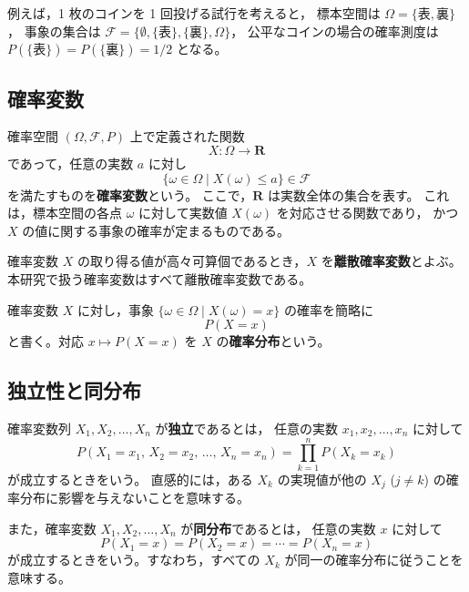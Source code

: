 \documentclass[a4j,dvipdfmx]{jsarticle}
\theoremstyle{plainnote}
\begin{document}
例えば，1 枚のコインを 1 回投げる試行を考えると，
標本空間は $\Omega=\{\text{表},\text{裏}\}$，
事象の集合は $\mathcal{F}=\{\emptyset,\{\text{表}\},\{\text{裏}\},\Omega\}$，
公平なコインの場合の確率測度は $P(\{\text{表}\})=P(\{\text{裏}\})=1/2$ となる。

\subsection{確率変数}

確率空間 $(\Omega,\mathcal{F},P)$ 上で定義された関数
\[
  X:\Omega \longrightarrow \mathbf{R}
\]
であって，任意の実数 $a$ に対し
\[
  \{\omega \in \Omega \mid X(\omega)\leq a\} \in \mathcal{F}
\]
を満たすものを\textbf{確率変数}という。
ここで，$\mathbf{R}$ は実数全体の集合を表す。
これは，標本空間の各点 $\omega$ に対して実数値 $X(\omega)$ を対応させる関数であり，
かつ $X$ の値に関する事象の確率が定まるものである。

確率変数 $X$ の取り得る値が高々可算個であるとき，$X$ を\textbf{離散確率変数}とよぶ。
本研究で扱う確率変数はすべて離散確率変数である。

確率変数 $X$ に対し，事象 $\{\omega\in\Omega\mid X(\omega)=x\}$ の確率を簡略に
\[
  P(X=x)
\]
と書く。対応 $x \mapsto P(X=x)$ を $X$ の\textbf{確率分布}という。
\subsection{独立性と同分布}\label{subsec:iid}

確率変数列 $X_1,X_2,\ldots,X_n$ が\textbf{独立}であるとは，
任意の実数 $x_1,x_2,\ldots,x_n$ に対して
\begin{equation}
  P(X_1=x_1,\,X_2=x_2,\,\ldots,\,X_n=x_n)
  =\prod_{k=1}^{n} P(X_k=x_k)
  \label{eq:independence}
\end{equation}
が成立するときをいう。
直感的には，ある $X_k$ の実現値が他の $X_j$ ($j\neq k$) の確率分布に影響を与えないことを意味する。

また，確率変数 $X_1,X_2,\ldots,X_n$ が\textbf{同分布}であるとは，
任意の実数 $x$ に対して
\begin{equation}
  P(X_1=x)=P(X_2=x)=\cdots=P(X_n=x)
  \label{eq:identical}
\end{equation}
が成立するときをいう。すなわち，すべての $X_k$ が同一の確率分布に従うことを意味する。
\end{document}
